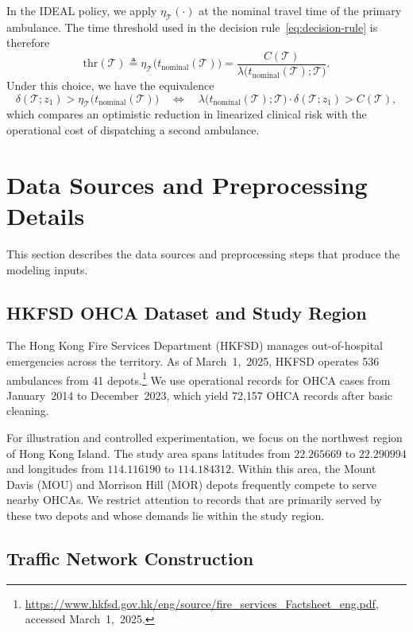 \documentclass[11pt, letterpaper, oneside, reqno]{amsart}
\newcommand{\Let}{\triangleq}
\begin{document}
In the IDEAL policy, we apply $\eta_{\mathcal T}(\cdot)$ at the nominal travel time of the primary ambulance. The time threshold used in the decision rule~\eqref{eq:decision-rule} is therefore
\[
\mathrm{thr}(\mathcal T) \Let \eta_{\mathcal T}\bigl(t_{\text{nominal}}(\mathcal T)\bigr)
= \frac{C(\mathcal T)}{\lambda\bigl(t_{\text{nominal}}(\mathcal T);\mathcal T\bigr)}.
\]
Under this choice, we have the equivalence
\[
\delta(\mathcal T; z_1) > \eta_{\mathcal T}\bigl(t_{\text{nominal}}(\mathcal T)\bigr) \quad \iff \quad
\lambda\bigl(t_{\text{nominal}}(\mathcal T);\mathcal T\bigr) \cdot \delta(\mathcal T; z_1) > C(\mathcal T),
\]
which compares an optimistic reduction in linearized clinical risk with the operational cost of dispatching a second ambulance.


\section{Data Sources and Preprocessing Details}\label{ec:data-details}
This section describes the data sources and preprocessing steps that produce the modeling inputs.

\subsection{HKFSD OHCA Dataset and Study Region}
\label{ec:dataset-and-region}

The Hong Kong Fire Services Department (HKFSD) manages out-of-hospital emergencies across the territory. As of March~1,~2025, HKFSD operates 536 ambulances from 41 depots.\footnote{\url{https://www.hkfsd.gov.hk/eng/source/fire_services_Factsheet_eng.pdf}, accessed March~1,~2025.} We use operational records for OHCA cases from January~2014 to December~2023, which yield 72{,}157 OHCA records after basic cleaning.

For illustration and controlled experimentation, we focus on the northwest region of Hong Kong Island. The study area spans latitudes from $22.265669$ to $22.290994$ and longitudes from $114.116190$ to $114.184312$. Within this area, the Mount Davis (MOU) and Morrison Hill (MOR) depots frequently compete to serve nearby OHCAs. We restrict attention to records that are primarily served by these two depots and whose demands lie within the study region.

\subsection{Traffic Network Construction}
\label{ec:traffic-network}
\end{document}
